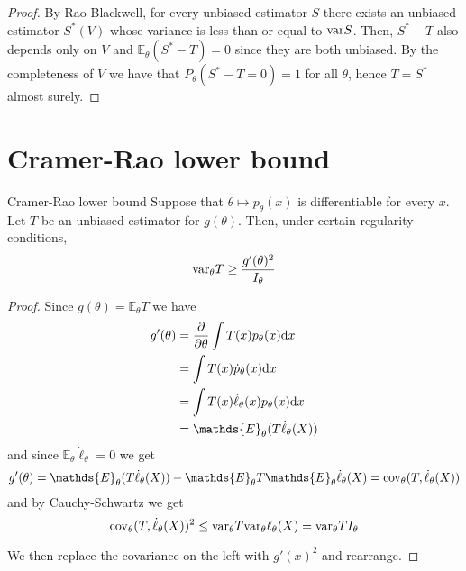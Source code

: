 \documentclass[12pt]{extarticle}
\newcommand{\cov}{{\operatorfont cov}}
\renewcommand{\var}{{\operatorfont var}}
\newcommand{\E}{\mathds{E}}
\begin{document}
\begin{proof}
	By Rao-Blackwell, for every unbiased estimator $S$ there exists an unbiased estimator $S^*(V)$
	whose variance is less than or equal to $\var S$.
	Then, $S^* - T$ also depends only on $V$ and $\E_\theta(S^* - T) = 0$ since they are both unbiased.
	By the completeness of $V$ we have that $P_\theta(S^* - T = 0) = 1$ for all $\theta$,
	hence $T = S^*$ almost surely.
\end{proof}

\section{Cramer-Rao lower bound}

\begin{theorem}{Cramer-Rao lower bound}{}
	Suppose that $\theta \mapsto p_\theta(x)$ is differentiable for every $x$.
	Let $T$ be an unbiased estimator for $g(\theta)$.
	Then, under certain regularity conditions,
	\begin{equation}
		\var_\theta T \geq \frac{g'(\theta)^2}{I_\theta}
	\end{equation}
\end{theorem}

\begin{proof}
	Since $g(\theta) = \E_\theta T$ we have
	\begin{align}
		g'(\theta) & = \pdv{\theta} \int T(x) p_\theta(x) \dd x        \\
		           & = \int T(x) \dot{p}_\theta(x) \dd x               \\
		           & = \int T(x) \dot \ell_\theta(x) p_\theta(x) \dd x \\
		           & = \E_\theta (T \dot \ell_\theta (X))
	\end{align}
	and since $\E_\theta \dot \ell_\theta = 0$ we get
	\begin{equation}
		g'(\theta) = \E_\theta (T \dot \ell_\theta (X)) - \E_\theta T \E_\theta \dot \ell_\theta(X) = \cov_\theta(T, \dot \ell_\theta(X))
	\end{equation}
	and by Cauchy-Schwartz we get
	\begin{equation}
		\cov_\theta(T, \dot \ell_\theta(X))^2 \leq \var_\theta T \var_\theta \ell_\theta(X) = \var_\theta T I_\theta
	\end{equation}

	We then replace the covariance on the left with $g'(x)^2$ and rearrange.
\end{proof}
\end{document}
